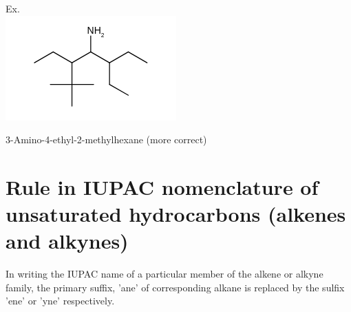 \documentclass[10pt]{article}
\begin{document}
Ex.\\
\includegraphics{smile-49043efe505c91c8a6969f986bf7db810c014bcd}

3-Amino-4-ethyl-2-methylhexane (more correct)

\section*{Rule in IUPAC nomenclature of unsaturated hydrocarbons (alkenes and alkynes)}
In writing the IUPAC name of a particular member of the alkene or alkyne family, the primary suffix, 'ane' of corresponding alkane is replaced by the sulfix 'ene' or 'yne' respectively.
\end{document}
